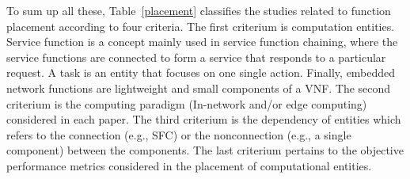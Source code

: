 To sum up all these, Table~\ref{placement} classifies the studies related to function placement according to four criteria. The first criterium is computation entities. Service function is a concept mainly used in service function chaining, where the service functions are connected to form a service that responds to a particular request. A task is an entity that focuses on one single action. Finally, embedded network functions are lightweight and small components of a VNF. The second criterium is the computing paradigm (In-network and/or edge computing) considered in each paper. The third criterium is the dependency of entities which refers to the connection (e.g., SFC) or the nonconnection (e.g., a single component) between the components. The last criterium pertains to the objective performance metrics considered in the placement of computational entities.


